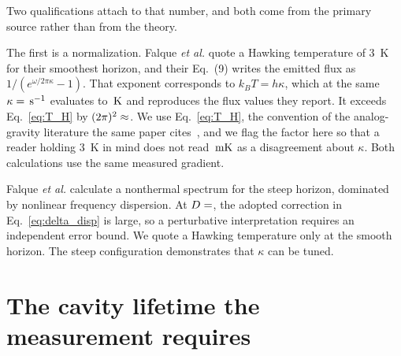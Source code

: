 \documentclass[aps,prl,twocolumn,superscriptaddress,nofootinbib]{revtex4-2}
\begin{document}
Two qualifications attach to that number, and both come from the
primary source rather than from the theory.

The first is a normalization. Falque \emph{et al.} quote a Hawking
temperature of \SI{3}{\kelvin} for their smoothest horizon, and
their Eq.~(9) writes the emitted flux as
$1/(e^{\omega/2\pi\kappa}-1)$. That exponent corresponds to
$k_B T = h\kappa$, which at the same
$\kappa = \unskip\,\mathrm{s}^{-1}$ evaluates to
$\unskip\,\si{\kelvin}$ and reproduces the
flux values they report. It exceeds Eq.~\eqref{eq:T_H} by
$(2\pi)^2 \approx \unskip$. We use
Eq.~\eqref{eq:T_H}, the convention of the analog-gravity literature
the same paper cites~\cite{Visser1998,Unruh1981,Barcelo2011}, and we
flag the factor here so that a reader holding \SI{3}{\kelvin} in
mind does not read
$\unskip\,\si{\milli\kelvin}$ as a
disagreement about $\kappa$. Both calculations use the same
measured gradient.

Falque \emph{et al.} calculate a nonthermal spectrum for the steep
horizon, dominated by nonlinear frequency dispersion. At
$D = \unskip$, the adopted correction in
Eq.~\eqref{eq:delta_disp} is large, so a perturbative interpretation
requires an independent error bound. We quote a Hawking temperature
only at the smooth horizon. The steep configuration demonstrates
that $\kappa$ can be tuned.

\section{The cavity lifetime the measurement requires}

\end{document}
